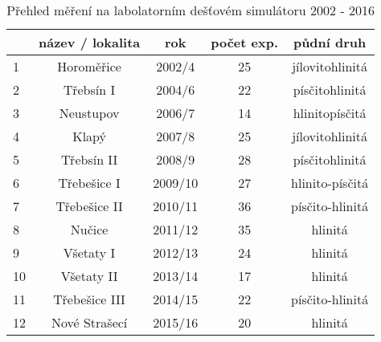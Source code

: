 \begin{table}[htbp]
  \centering
  \caption{Přehled měření na labolatorním dešťovém simulátoru 2002 - 2016}
    \begin{tabular}{lcccc}
    \hline 
          &název / lokalita& rok & počet exp. & půdní druh \\
          \hline 
          \hline 
    1     & Horoměřice & 2002/4 & 25    & jílovitohlinitá \\
    2     & Třebsín I & 2004/6 & 22    & písčitohlinitá \\
    3     & Neustupov & 2006/7 & 14    & hlinitopísčitá \\
    4     & Klapý & 2007/8 & 25    & jílovitohlinitá \\
    5     & Třebsín II & 2008/9 & 28    & písčitohlinitá \\
    6     & Třebešice I & 2009/10 & 27    & hlinito-písčitá \\
    7     & Třebešice II & 2010/11 & 36    & písčito-hlinitá \\
    8     & Nučice & 2011/12 & 35    & hlinitá \\
    9     & Všetaty I & 2012/13 & 24    & hlinitá \\
    10    & Všetaty II & 2013/14 & 17    & hlinitá \\
    11    & Třebešice III & 2014/15 & 22    & písčito-hlinitá \\
    12    & Nové Strašecí & 2015/16 & 20    & hlinitá \\
    \hline 
    \end{tabular}%
  \label{tab:addlabel}%
\end{table}%
